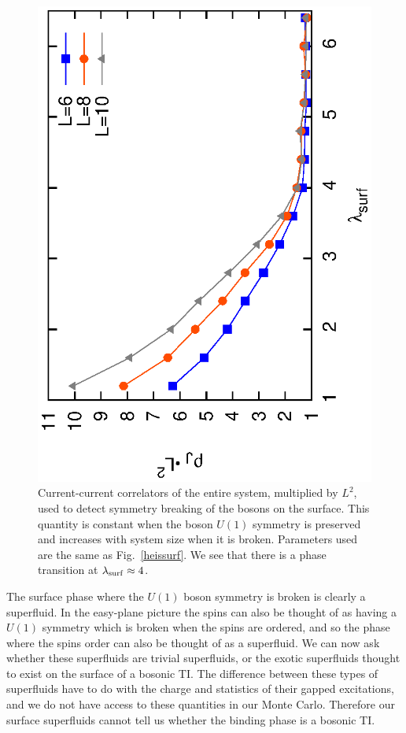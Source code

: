 \documentclass[prb,twocolumn]{revtex4-1}
\begin{document}
\begin{figure}
\includegraphics[angle=-90,width=0.9\linewidth]{figures/slabcurs.eps}
\caption{Current-current correlators of the entire system, multiplied by $L^2$, used to detect symmetry breaking of the bosons on the surface. This quantity is constant when the boson $U(1)$ symmetry is preserved and increases with system size when it is broken. Parameters used are the same as Fig.~\ref{heissurf}. We see that there is a phase transition at $\lambda_{\rm surf}\approx 4$.
}
\label{slabcurs}
\end{figure} 

The surface phase where the $U(1)$ boson symmetry is broken is clearly a superfluid. In the easy-plane picture the spins can also be thought of as having a $U(1)$ symmetry which is broken when the spins are ordered, and so the phase where the spins order can also be thought of as a superfluid. We can now ask whether these superfluids are trivial superfluids, or the exotic superfluids thought to exist on the surface of a bosonic TI.\cite{SenthilVishwanath} The difference between these types of superfluids have to do with the charge and statistics of their gapped excitations, and we do not have access to these quantities in our Monte Carlo. Therefore our surface superfluids cannot tell us whether the binding phase is a bosonic TI.
\end{document}

